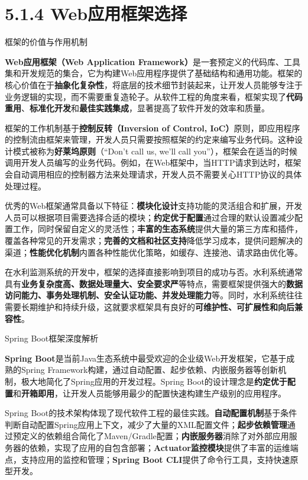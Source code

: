\section{5.1.4 Web应用框架选择}

 框架的价值与作用机制

\textbf{Web应用框架（Web Application Framework）}是一套预定义的代码库、工具集和开发规范的集合，它为构建Web应用程序提供了基础结构和通用功能。框架的核心价值在于\textbf{抽象化复杂性}，将底层的技术细节封装起来，让开发人员能够专注于业务逻辑的实现，而不需要重复造轮子。从软件工程的角度来看，框架实现了\textbf{代码重用}、\textbf{标准化开发}和\textbf{最佳实践集成}，显著提高了软件开发的效率和质量。

框架的工作机制基于\textbf{控制反转（Inversion of Control, IoC）}原则，即应用程序的控制流由框架来管理，开发人员只需要按照框架的约定来编写业务代码。这种设计模式被称为\textbf{好莱坞原则}（``Don't call us, we'll call you''），框架会在适当的时候调用开发人员编写的业务代码。例如，在Web框架中，当HTTP请求到达时，框架会自动调用相应的控制器方法来处理请求，开发人员不需要关心HTTP协议的具体处理过程。

优秀的Web框架通常具备以下特征：\textbf{模块化设计}支持功能的灵活组合和扩展，开发人员可以根据项目需要选择合适的模块；\textbf{约定优于配置}通过合理的默认设置减少配置工作，同时保留自定义的灵活性；\textbf{丰富的生态系统}提供大量的第三方库和插件，覆盖各种常见的开发需求；\textbf{完善的文档和社区支持}降低学习成本，提供问题解决的渠道；\textbf{性能优化机制}内置各种性能优化策略，如缓存、连接池、请求路由优化等。

在水利监测系统的开发中，框架的选择直接影响到项目的成功与否。水利系统通常具有\textbf{业务复杂度高、数据处理量大、安全要求严}等特点，需要框架提供强大的\textbf{数据访问能力、事务处理机制、安全认证功能、并发处理能力}等。同时，水利系统往往需要长期维护和持续升级，这就要求框架具有良好的\textbf{可维护性、可扩展性和向后兼容性}。

 Spring Boot框架深度解析

\textbf{Spring Boot}是当前Java生态系统中最受欢迎的企业级Web开发框架，它基于成熟的Spring Framework构建，通过自动配置、起步依赖、内嵌服务器等创新机制，极大地简化了Spring应用的开发过程。Spring Boot的设计理念是\textbf{约定优于配置}和\textbf{开箱即用}，让开发人员能够用最少的配置快速构建生产级别的应用程序。

Spring Boot的技术架构体现了现代软件工程的最佳实践。\textbf{自动配置机制}基于条件判断自动配置Spring应用上下文，减少了大量的XML配置文件；\textbf{起步依赖管理}通过预定义的依赖组合简化了Maven/Gradle配置；\textbf{内嵌服务器}消除了对外部应用服务器的依赖，实现了应用的自包含部署；\textbf{Actuator监控模块}提供了丰富的运维端点，支持应用的监控和管理；\textbf{Spring Boot CLI}提供了命令行工具，支持快速原型开发。

